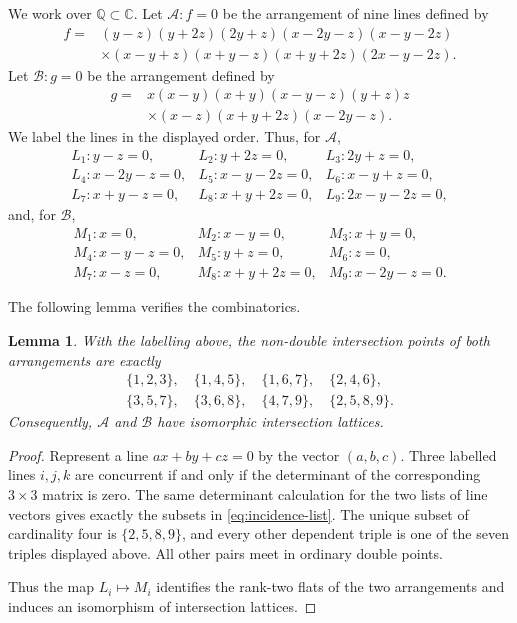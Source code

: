 \documentclass[11pt]{amsart}
\newcommand{\CC}{\mathbb C}
\newcommand{\QQ}{\mathbb Q}
\newcommand{\cA}{\mathcal A}
\newcommand{\cB}{\mathcal B}
\theoremstyle{plain}
\newtheorem{lemma}[theorem]{Lemma}
\theoremstyle{definition}
\numberwithin{equation}{section}
\begin{document}
We work over \(\QQ\subset \CC\).  Let \(\cA:f=0\) be the arrangement of nine lines defined by
\begin{equation}\label{eq:f-def}
\begin{aligned}
f={}&(y-z)(y+2z)(2y+z)(x-2y-z)(x-y-2z)  \\
&\times (x-y+z)(x+y-z)(x+y+2z)(2x-y-2z).
\end{aligned}
\end{equation}
Let \(\cB:g=0\) be the arrangement defined by
\begin{equation}\label{eq:g-def}
\begin{aligned}
g={}&x(x-y)(x+y)(x-y-z)(y+z)z  \\
&\times (x-z)(x+y+2z)(x-2y-z).
\end{aligned}
\end{equation}
We label the lines in the displayed order.  Thus, for \(\cA\),
\[
\begin{array}{lll}
L_1:y-z=0, & L_2:y+2z=0, & L_3:2y+z=0,\\
L_4:x-2y-z=0, & L_5:x-y-2z=0, & L_6:x-y+z=0,\\
L_7:x+y-z=0, & L_8:x+y+2z=0, & L_9:2x-y-2z=0,
\end{array}
\]
and, for \(\cB\),
\[
\begin{array}{lll}
M_1:x=0, & M_2:x-y=0, & M_3:x+y=0,\\
M_4:x-y-z=0, & M_5:y+z=0, & M_6:z=0,\\
M_7:x-z=0, & M_8:x+y+2z=0, & M_9:x-2y-z=0.
\end{array}
\]

The following lemma verifies the combinatorics.

\begin{lemma}\label{lem:lattice}
With the labelling above, the non-double intersection points of both arrangements are exactly
\begin{equation}\label{eq:incidence-list}
\begin{gathered}
\{1,2,3\},\quad
\{1,4,5\},\quad
\{1,6,7\},\quad
\{2,4,6\},\\
\{3,5,7\},\quad
\{3,6,8\},\quad
\{4,7,9\},\quad
\{2,5,8,9\}.
\end{gathered}
\end{equation}
Consequently, \(\cA\) and \(\cB\) have isomorphic intersection lattices.
\end{lemma}

\begin{proof}
Represent a line \(a x+b y+c z=0\) by the vector \((a,b,c)\).  Three labelled lines \(i,j,k\) are concurrent if and only if the determinant of the corresponding \(3\times3\) matrix is zero.  The same determinant calculation for the two lists of line vectors gives exactly the subsets in \eqref{eq:incidence-list}.  The unique subset of cardinality four is \(\{2,5,8,9\}\), and every other dependent triple is one of the seven triples displayed above.  All other pairs meet in ordinary double points.

Thus the map \(L_i\mapsto M_i\) identifies the rank-two flats of the two arrangements and induces an isomorphism of intersection lattices.
\end{proof}
\end{document}
